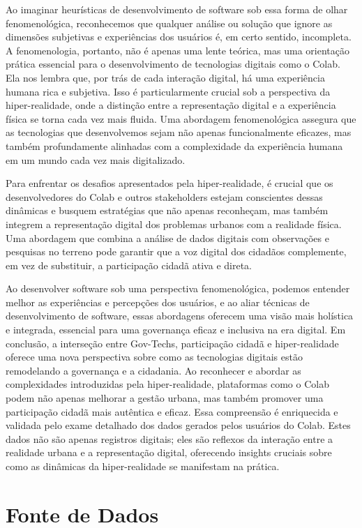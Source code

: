 Ao imaginar heurísticas de desenvolvimento de software sob essa forma de olhar fenomenológica, reconhecemos que qualquer análise ou solução que ignore as dimensões subjetivas e experiências dos usuários é, em certo sentido, incompleta. A fenomenologia, portanto, não é apenas uma lente teórica, mas uma orientação prática essencial para o desenvolvimento de tecnologias digitais como o Colab. Ela nos lembra que, por trás de cada interação digital, há uma experiência humana rica e subjetiva. Isso é particularmente crucial sob a perspectiva da hiper-realidade, onde a distinção entre a representação digital e a experiência física se torna cada vez mais fluida. Uma abordagem fenomenológica assegura que as tecnologias que desenvolvemos sejam não apenas funcionalmente eficazes, mas também profundamente alinhadas com a complexidade da experiência humana em um mundo cada vez mais digitalizado.

Para enfrentar os desafios apresentados pela hiper-realidade, é crucial que os desenvolvedores do Colab e outros stakeholders estejam conscientes dessas dinâmicas e busquem estratégias que não apenas reconheçam, mas também integrem a representação digital dos problemas urbanos com a realidade física. Uma abordagem que combina a análise de dados digitais com observações e pesquisas no terreno pode garantir que a voz digital dos cidadãos complemente, em vez de substituir, a participação cidadã ativa e direta.

Ao desenvolver software sob uma perspectiva fenomenológica, podemos entender melhor as experiências e percepções dos usuários, e ao aliar técnicas de desenvolvimento de software, essas abordagens oferecem uma visão mais holística e integrada, essencial para uma governança eficaz e inclusiva na era digital. Em conclusão, a interseção entre Gov-Techs, participação cidadã e hiper-realidade oferece uma nova perspectiva sobre como as tecnologias digitais estão remodelando a governança e a cidadania. Ao reconhecer e abordar as complexidades introduzidas pela hiper-realidade, plataformas como o Colab podem não apenas melhorar a gestão urbana, mas também promover uma participação cidadã mais autêntica e eficaz. Essa compreensão é enriquecida e validada pelo exame detalhado dos dados gerados pelos usuários do Colab. Estes dados não são apenas registros digitais; eles são reflexos da interação entre a realidade urbana e a representação digital, oferecendo insights cruciais sobre como as dinâmicas da hiper-realidade se manifestam na prática.

\section{Fonte de Dados}

